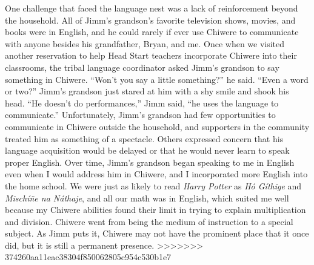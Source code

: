 \documentclass[output=paper]{LSP/langsci}
\begin{document}
One challenge that faced the language nest was a lack of reinforcement beyond the household. All of Jimm's grandson's favorite television shows, movies, and books were in English, and he could rarely if ever use Chiwere to communicate with anyone besides his grandfather, Bryan, and me. Once when we visited another reservation to help Head Start teachers incorporate Chiwere into their classrooms, the tribal language coordinator asked Jimm's grandson to say something in Chiwere. ``Won't you say a little something?'' he said. ``Even a word or two?'' Jimm's grandson just stared at him with a shy smile and shook his head. ``He doesn't do performances,'' Jimm said, ``he uses the language to communicate.'' Unfortunately, Jimm's grandson had few opportunities to communicate in Chiwere outside the household, and supporters in the community treated him as something of a spectacle. Others expressed concern that his language acquisition would be delayed or that he would never learn to speak proper English. Over time, Jimm's grandson began speaking to me in English even when I would address him in Chiwere, and I incorporated more English into the home school. We were just as likely to read \emph{Harry Potter} as \emph{H\'o G\'ithige} and \emph{Misch\'i\~ne na N\'athaje}, and all our math was in English, which suited me well because my Chiwere abilities found their limit in trying to explain multiplication and division. Chiwere went from being the medium of instruction to a special subject. As Jimm puts it, Chiwere may not have the prominent place that it once did, but it is still a permanent presence.
>>>>>>> 374260aa11eac38304f850062805c954c530b1e7
\end{document}
